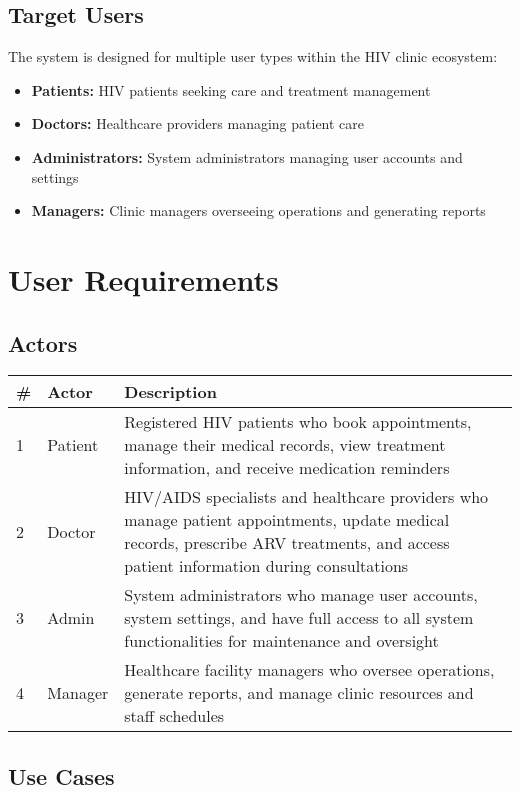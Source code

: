 \documentclass[12pt,a4paper]{article}
\begin{document}
\subsection{Target Users}

The system is designed for multiple user types within the HIV clinic ecosystem:
\begin{itemize}
    \item \textbf{Patients:} HIV patients seeking care and treatment management
    \item \textbf{Doctors:} Healthcare providers managing patient care
    \item \textbf{Administrators:} System administrators managing user accounts and settings
    \item \textbf{Managers:} Clinic managers overseeing operations and generating reports
\end{itemize}

\section{User Requirements}

\subsection{Actors}

\begin{longtable}{|p{1cm}|p{3cm}|p{10cm}|}
\hline
\textbf{\#} & \textbf{Actor} & \textbf{Description} \\
\hline
1 & Patient & Registered HIV patients who book appointments, manage their medical records, view treatment information, and receive medication reminders \\
\hline
2 & Doctor & HIV/AIDS specialists and healthcare providers who manage patient appointments, update medical records, prescribe ARV treatments, and access patient information during consultations \\
\hline
3 & Admin & System administrators who manage user accounts, system settings, and have full access to all system functionalities for maintenance and oversight \\
\hline
4 & Manager & Healthcare facility managers who oversee operations, generate reports, and manage clinic resources and staff schedules \\
\hline
\end{longtable}

\subsection{Use Cases}
\end{document}
